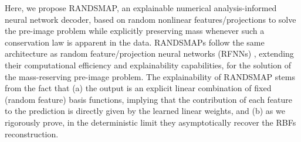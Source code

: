 \documentclass{article}
\begin{document}
Here, we propose RANDSMAP, an explainable numerical analysis-informed neural network decoder, based on random nonlinear features/projections \cite{rahimi2008uniform,gorban2016approximation,bach2017equivalence,liu2021random,nelsen2021random,surasinghe2021randomized} to solve the pre-image problem while explicitly preserving mass whenever such a conservation law is apparent in the data. RANDSMAPs follow the same architecture as random feature/projection neural networks (RFNNs) \cite{igelnik1995stochastic,huang2006extreme,scardapane2017randomness,cao2018review,fabiani2021numerical,galaris2022numerical,fabiani2023parsimonious,bollt2024neural,bolager2023sampling,dong2023method,sun2024local,fabiani2025randonets,fabiani2025random}, extending their computational efficiency and explainability capabilities,  for the solution of the mass-reserving pre-image problem. %
The explainability of RANDSMAP stems from the fact that (a) the output is an explicit linear combination of fixed (random feature) basis functions, implying that the contribution of each feature to the prediction is directly given by the learned linear weights, and (b) as we rigorously prove, in the deterministic limit they  asymptotically recover the RBFs reconstruction.
\end{document}
